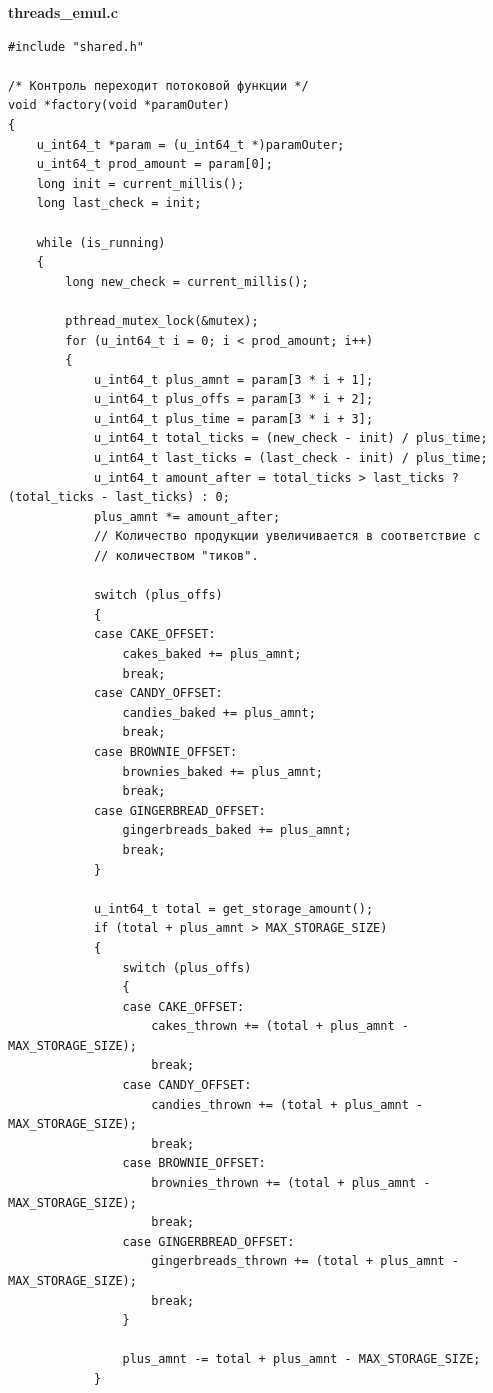 \documentclass[a4paper,14pt]{extarticle}
\begin{document}
\textbf{threads\_emul.c}
\begin{verbatim}
#include "shared.h"

/* Контроль переходит потоковой функции */
void *factory(void *paramOuter)
{
    u_int64_t *param = (u_int64_t *)paramOuter;
    u_int64_t prod_amount = param[0];
    long init = current_millis();
    long last_check = init;

    while (is_running)
    {
        long new_check = current_millis();

        pthread_mutex_lock(&mutex);
        for (u_int64_t i = 0; i < prod_amount; i++)
        {
            u_int64_t plus_amnt = param[3 * i + 1];
            u_int64_t plus_offs = param[3 * i + 2];
            u_int64_t plus_time = param[3 * i + 3];
            u_int64_t total_ticks = (new_check - init) / plus_time;
            u_int64_t last_ticks = (last_check - init) / plus_time;
            u_int64_t amount_after = total_ticks > last_ticks ? (total_ticks - last_ticks) : 0;
            plus_amnt *= amount_after;
            // Количество продукции увеличивается в соответствие с
            // количеством "тиков".

            switch (plus_offs)
            {
            case CAKE_OFFSET:
                cakes_baked += plus_amnt;
                break;
            case CANDY_OFFSET:
                candies_baked += plus_amnt;
                break;
            case BROWNIE_OFFSET:
                brownies_baked += plus_amnt;
                break;
            case GINGERBREAD_OFFSET:
                gingerbreads_baked += plus_amnt;
                break;
            }

            u_int64_t total = get_storage_amount();
            if (total + plus_amnt > MAX_STORAGE_SIZE)
            {
                switch (plus_offs)
                {
                case CAKE_OFFSET:
                    cakes_thrown += (total + plus_amnt - MAX_STORAGE_SIZE);
                    break;
                case CANDY_OFFSET:
                    candies_thrown += (total + plus_amnt - MAX_STORAGE_SIZE);
                    break;
                case BROWNIE_OFFSET:
                    brownies_thrown += (total + plus_amnt - MAX_STORAGE_SIZE);
                    break;
                case GINGERBREAD_OFFSET:
                    gingerbreads_thrown += (total + plus_amnt - MAX_STORAGE_SIZE);
                    break;
                }

                plus_amnt -= total + plus_amnt - MAX_STORAGE_SIZE;
            }


\end{verbatim}
\end{document}
